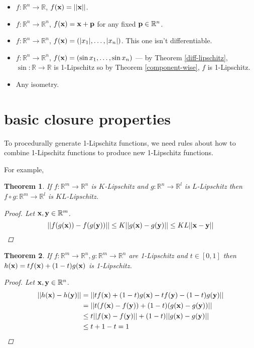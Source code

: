 \documentclass{article}
\newcommand\bb\mathbb
\renewcommand\vec\textbf
\newtheorem{theorem}{Theorem}
\begin{document}
\begin{itemize}
\item $f:\bb R^n\to \bb R$, $f(\vec x) = ||\vec x||$.
\item $f:\bb R^n\to \bb R^n$, $f(\vec x) = \vec x + \vec p$ for any fixed $\vec p\in\bb R^n$.
\item $f:\bb R^n\to \bb R^n$, $f(\vec x) = (|x_1|,\dots,|x_n|)$. This one isn't differentiable.
\item $f:\bb R^n\to\bb R^n$, $f(\vec x) = (\sin x_1,\dots,\sin x_n)$ --- by Theorem \ref{diff-lipschitz},
$\sin:\bb R\to\bb R$ is 1-Lipschitz so by Theorem \ref{component-wise}, $f$ is 1-Lipschitz.
\item Any isometry.
\end{itemize}

\section{basic closure properties}

To procedurally generate 1-Lipschitz functions, we need rules about how to combine 1-Lipschitz
functions to produce new 1-Lipschitz functions.

For example,

\begin{theorem}
\label{composition}
If $f : \bb R^m \to \bb R^n$ is $K$-Lipschitz and $g:\bb R^n\to\bb R^l$ is $L$-Lipschitz then
 $f\circ g:\bb R^m\to\bb R^l$ is $KL$-Lipschitz.
\begin{proof}
Let $\vec x,\vec y\in\bb R^m$.
$$||f(g(\vec x)) - f(g(\vec y))|| \leq K||g(\vec x) - g(\vec y)|| \leq KL||\vec x - \vec y||$$
\end{proof}
\end{theorem}

\begin{theorem}
\label{mixing}
If $f : \bb R^m \to \bb R^n,g:\bb R^m\to\bb R^n$ are 1-Lipschitz and $t\in[0,1]$ then
$h(\vec x) = tf(\vec x) + (1-t)g(\vec x)$ is 1-Lipschitz.
\begin{proof}
Let $\vec x,\vec y\in\bb R^n$.
\begin{align*}
||h(\vec x) - h(\vec y)|| &= ||tf(\vec x) + (1-t)g(\vec x) - tf(\vec y) - (1-t)g(\vec y)||\\
&= ||t(f(\vec x) - f(\vec y)) + (1-t)(g(\vec x) - g(\vec y))||\\
&\leq t||f(\vec x) - f(\vec y)|| + (1-t)||g(\vec x) - g(\vec y)||\\
&\leq t + 1 - t = 1
\end{align*}
\end{proof}
\end{theorem}
\end{document}
